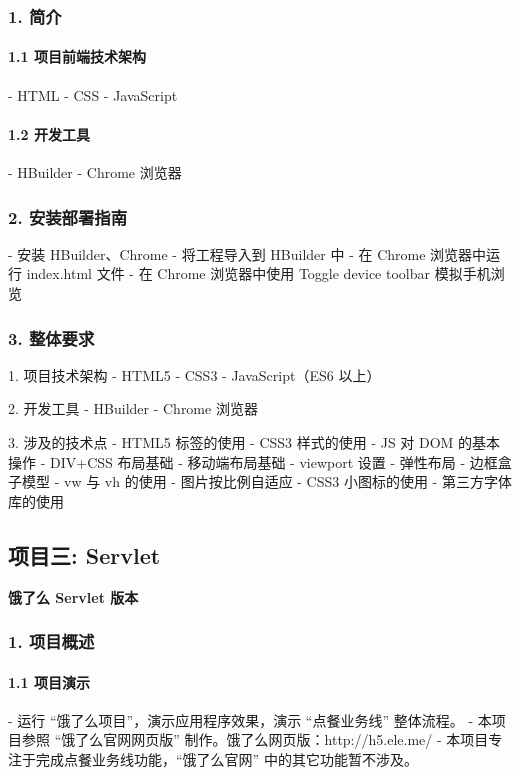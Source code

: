 \subsubsection*{1. 简介}

\paragraph*{1.1 项目前端技术架构}
- HTML
- CSS
- JavaScript

\paragraph*{1.2 开发工具}
- HBuilder
- Chrome 浏览器

\subsubsection*{2. 安装部署指南}
- 安装 HBuilder、Chrome
- 将工程导入到 HBuilder 中
- 在 Chrome 浏览器中运行 index.html 文件
- 在 Chrome 浏览器中使用 Toggle device toolbar 模拟手机浏览

\subsubsection*{3. 整体要求}
1. 项目技术架构
   - HTML5
   - CSS3
   - JavaScript（ES6 以上）
   
2. 开发工具
   - HBuilder
   - Chrome 浏览器
   
3. 涉及的技术点
   - HTML5 标签的使用
   - CSS3 样式的使用
   - JS 对 DOM 的基本操作
   - DIV+CSS 布局基础
   - 移动端布局基础
   - viewport 设置
   - 弹性布局
   - 边框盒子模型
   - vw 与 vh 的使用
   - 图片按比例自适应
   - CSS3 小图标的使用
   - 第三方字体库的使用


\subsection*{项目三: Servlet}

\textbf{饿了么 Servlet 版本}

\subsubsection*{1. 项目概述}

\paragraph*{1.1 项目演示}
- 运行 “饿了么项目”，演示应用程序效果，演示 “点餐业务线” 整体流程。
- 本项目参照 “饿了么官网网页版” 制作。饿了么网页版：http://h5.ele.me/
- 本项目专注于完成点餐业务线功能，“饿了么官网” 中的其它功能暂不涉及。

